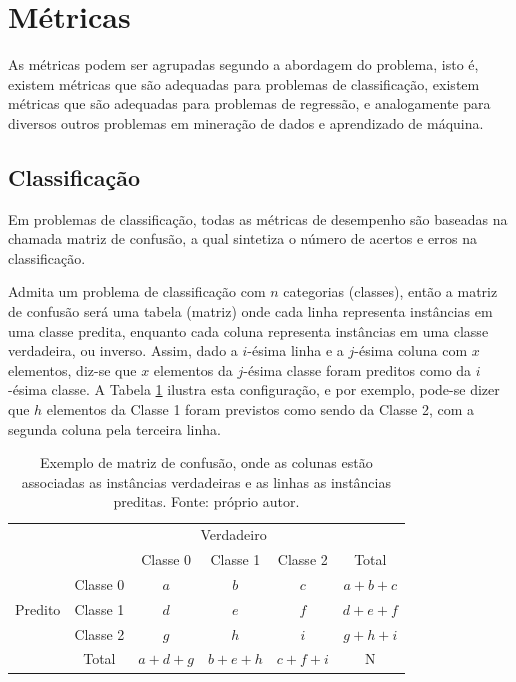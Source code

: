\section{Métricas}

As métricas podem ser agrupadas segundo a abordagem do problema, isto é, existem métricas que são adequadas para problemas de classificação, existem métricas que são adequadas para problemas de regressão, e analogamente para diversos outros problemas em mineração de dados e aprendizado de máquina.

\subsection{Classificação}

Em problemas de classificação, todas as métricas de desempenho são baseadas na chamada matriz de confusão, a qual sintetiza o número de acertos e erros na classificação.

Admita um problema de classificação com $n$ categorias (classes), então a matriz de confusão será uma tabela (matriz) onde cada linha representa instâncias em uma classe predita, enquanto cada coluna representa instâncias em uma classe verdadeira, ou inverso. Assim, dado a $i$-ésima linha e a $j$-ésima coluna com $x$ elementos, diz-se que $x$ elementos da $j$-ésima classe foram preditos como da $i$-ésima classe. A Tabela \ref{tab:mc1} ilustra esta configuração, e por exemplo, pode-se dizer que $h$ elementos da Classe 1 foram previstos como sendo da Classe 2, com a segunda coluna pela terceira linha.

\begin{table}[hhh]
\begin{tabular}{l|l|c|c|c|c}
\multicolumn{2}{c}{}&\multicolumn{3}{c}{Verdadeiro}&\\ \cline{3-5}
\multicolumn{2}{c|}{}&Classe 0& Classe 1 & Classe 2&\multicolumn{1}{c}{Total}\\ \cline{2-5}
\multirow{3}{*}{Predito}& Classe 0 & $a$ & $b$ & $c$ & $a+b+c$\\ \cline{2-5}
                        & Classe 1 & $d$ & $e$ & $f$ & $d+e+f$\\ \cline{2-5}
                        & Classe 2 & $g$ & $h$ & $i$ & $g+h+i$\\ \cline{2-5}
\multicolumn{1}{c}{} & \multicolumn{1}{c}{Total} & \multicolumn{1}{c}{$a+d+g$} & \multicolumn{    1}{c}{$b+e+h$} & \multicolumn{1}{c}{$c+f+i$} & \multicolumn{1}{c}{N}\\
\end{tabular}
\caption{Exemplo de matriz de confusão, onde as colunas estão associadas as instâncias verdadeiras e as linhas as instâncias preditas. Fonte: próprio autor.}
\label{tab:mc1}
\end{table}

